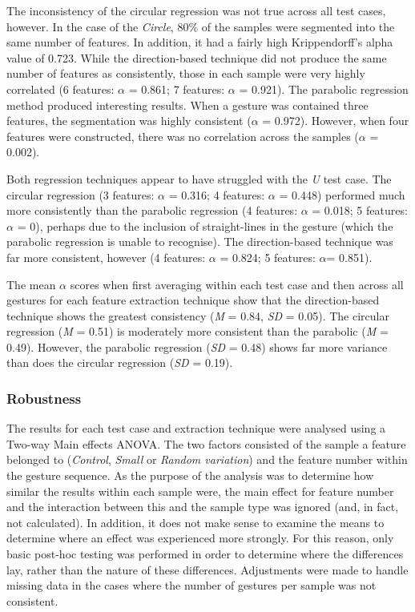 The inconsistency of the circular regression was not true across all test cases, however. In the case of the \emph{Circle}, 80\% of the samples were segmented into the same number of features. In addition, it had a fairly high Krippendorff's alpha value of 0.723. While the direction-based technique did not produce the same number of features as consistently, those in each sample were very highly correlated (6 features: $\alpha$ = 0.861; 7 features: $\alpha$ = 0.921). The parabolic regression method produced interesting results. When a gesture was contained three features, the segmentation was highly consistent ($\alpha$ = 0.972). However, when four features were constructed, there was no correlation across the samples ($\alpha$ = 0.002).

Both regression techniques appear to have struggled with the \emph{U} test case. The circular regression (3 features: $\alpha$ = 0.316; 4 features: $\alpha$ = 0.448) performed much more consistently than the parabolic regression (4 features: $\alpha$ = 0.018; 5 features: $\alpha$ = 0), perhaps due to the inclusion of straight-lines in the gesture (which the parabolic regression is unable to recognise). The direction-based technique was far more consistent, however (4 features: $\alpha$ = 0.824; 5 features: $\alpha$= 0.851).

The mean $\alpha$ scores when first averaging within each test case and then across all gestures for each feature extraction technique show that the direction-based technique shows the greatest consistency (\emph{M} = 0.84, \emph{SD} = 0.05). The circular regression (\emph{M} = 0.51) is moderately more consistent than the parabolic (\emph{M} = 0.49). However, the parabolic regression (\emph{SD} = 0.48) shows far more variance than does the circular regression (\emph{SD} = 0.19).

\subsubsection{Robustness}
The results for each test case and extraction technique were analysed using a Two-way Main effects ANOVA. The two factors consisted of the sample a feature belonged to (\emph{Control}, \emph{Small} or \emph{Random variation}) and the feature number within the gesture sequence. As the purpose of the analysis was to determine how similar the results within each sample were, the main effect for feature number and the interaction between this and the sample type was ignored (and, in fact, not calculated). In addition, it does not make sense to examine the means to determine where an effect was experienced more strongly. For this reason, only basic post-hoc testing was performed in order to determine where the differences lay, rather than the nature of these differences. Adjustments were made to handle missing data in the cases where the number of gestures per sample was not consistent.


